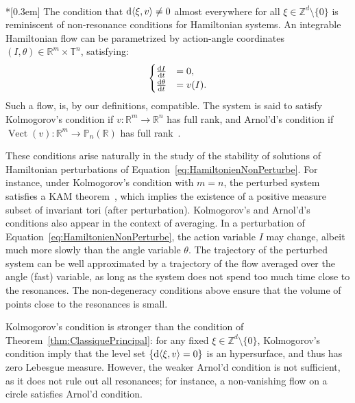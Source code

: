 \documentclass[AHL,Unicode,longabstracts]{cedram}
\DeclareMathOperator{\Vect}{Vect}
\newcommand{\Z}{\mathbb{Z}}
\newcommand{\R}{\mathbb{R}}
\newcommand{\Pbb}{\mathbb{P}}
\newcommand{\Tbb}{\mathbb{T}}
\newcommand{\de}{{\rm d}}
\begin{document}
\pagebreak
\begin{rema} \ \\*[0.3em]
The condition that $\de \langle \xi, v \rangle \neq 0$ almost everywhere for all $\xi \in \Z^d \setminus \{0\}$ is reminiscent of non-resonance conditions for Hamiltonian systems. An integrable Hamiltonian flow can be parametrized by action-angle coordinates $(I, \theta) \in \R^m \times \Tbb^n$, satisfying:
\begin{equation}\label{eq:HamiltonienNonPerturbe}
\begin{cases}
\frac{\de I}{\de t} & = 0, \\
\frac{\de \theta}{\de t} & = v(I).
\end{cases}
\end{equation}
Such a flow, is, by our definitions, compatible. The system is said to satisfy Kolmogorov's condition if $v : \R^m \to \R^n$ has full rank, and Arnol'd's condition if $\Vect(v) : \R^m \to \Pbb_n (\R)$ has full rank~\cite[Chapter~6.4]{LochakMeunier:1988}.


These conditions arise naturally in the study of the stability of solutions of Hamiltonian perturbations of Equation~\eqref{eq:HamiltonienNonPerturbe}. For instance, under Kolmogorov's condition with $m=n$, the perturbed system satisfies a KAM theorem~\cite{Kolmogorov:1954}, which implies the existence of a positive measure subset of invariant tori (after perturbation). Kolmogorov's and Arnol'd's conditions also appear in the context of averaging. In a perturbation of Equation~\eqref{eq:HamiltonienNonPerturbe}, the action variable $I$ may change, albeit much more slowly than the angle variable $\theta$. The trajectory of the perturbed system can be well approximated by a trajectory of the flow averaged over the angle (fast) variable, as long as the system does not spend too much time close to the resonances. The non-degeneracy conditions above ensure that the volume of points close to the resonances is small.


Kolmogorov's condition is stronger than the condition of Theorem~\ref{thm:ClassiquePrincipal}: for any fixed $\xi \in \Z^d \setminus \{0\}$, Kolmogorov's condition imply that the level set $\{\de \langle \xi, v \rangle = 0\}$ is an hypersurface, and thus has zero Lebesgue measure. However, the weaker Arnol'd condition is not sufficient, as it does not rule out all resonances; for instance, a non-vanishing flow on a circle satisfies Arnol'd condition.
\end{rema}
\end{document}
